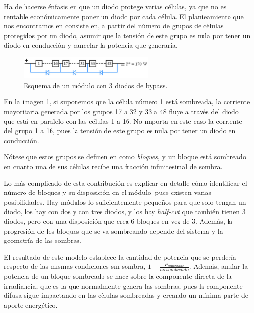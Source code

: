 Ha de hacerse énfasis en que un diodo protege varias células, ya que no es rentable económicamente poner un diodo por cada célula. El planteamiento que nos encontramos en \cite{Martínez-Moreno_Muñoz_Lorenzo_2010} consiste en, a partir del número de grupos de células protegidos por un diodo, asumir que la tensión de este grupo es nula por tener un diodo en conducción y cancelar la potencia que generaría.

\begin{figure}[H]
    \centering
    \includegraphics[width=0.6\textwidth]{./images/bypass_diodes/bypass_diodes.png}
    \caption{Esquema de un módulo con 3 diodos de bypass.}
    \label{fig:diodos_bypass}
\end{figure}

En la imagen \ref{fig:diodos_bypass}, si suponemos que la célula número 1 está sombreada, la corriente mayoritaria generada por los grupos 17 a 32 y 33 a 48 fluye a través del diodo que está en paralelo con las células 1 a 16. No importa en este caso la corriente del grupo 1 a 16, pues la tensión de este grupo es nula por tener un diodo en conducción.

Nótese que estos grupos se definen en \cite{Martínez-Moreno_Muñoz_Lorenzo_2010} como \textit{bloques}, y un bloque está sombreado en cuanto una de sus células recibe una fracción infinitesimal de sombra.

Lo más complicado de esta contribución es explicar en detalle cómo identificar el número de bloques y su disposición en el módulo, pues existen varias posibilidades. Hay módulos lo suficientemente pequeños para que solo tengan un diodo, los hay con dos y con tres diodos, y los hay \textit{half-cut} que también tienen 3 diodos, pero con una disposición que crea 6 bloques en vez de 3. Además, la progresión de los bloques que se va sombreando depende del sistema y la geometría de las sombras.

El resultado de este modelo establece la cantidad de potencia que se perdería respecto de las mismas condiciones sin sombra, $1 - \frac{P_\text{sombreado}}{{no\,sombreado}}$. Además, anular la potencia de un bloque sombreado se hace sobre la componente directa de la irradiancia, que es la que normalmente genera las sombras, pues la componente difusa sigue impactando en las células sombreadas y creando un mínima parte de aporte energético.

